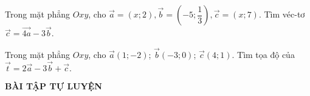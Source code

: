 \begin{vd}%
Trong mặt phẳng $Oxy$, cho $\vec{a}=(x; 2), \vec{b}=\left(- 5; \dfrac{1}{3}\right), \vec{c}=\left(x; 7\right)$. Tìm véc-tơ $\vec{c}=\vec{4a} - 3\vec{b}$.
\end{vd}
\begin{vd}%
Trong mặt phẳng $Oxy$, cho $\vec{a}(1; - 2)$; $\vec{b}(- 3; 0)$; $\vec{c}\left(4; 1\right)$. Tìm tọa độ của $\vec{t}=2\vec{a} - 3\vec{b} + \vec{c}. $
\end{vd}
\begin{center}
\textbf{BÀI TẬP TỰ LUYỆN}
\end{center}

